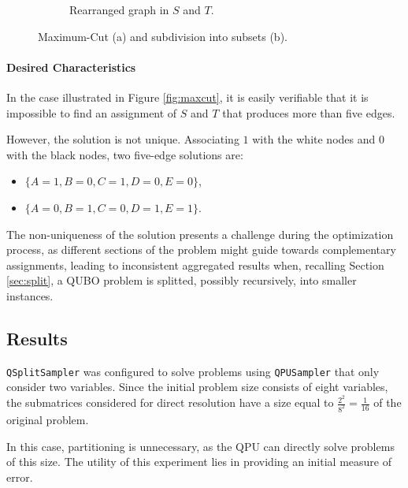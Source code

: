 \begin{figure}[H]
\begin{subfigure}[b]{0.48\textwidth}
        \caption{Rearranged graph in $S$ and $T$.}
        \label{fig:maxcutset}
    \end{subfigure}
    \caption{Maximum-Cut (a) and subdivision into subsets (b).}
\end{figure}

\paragraph{Desired Characteristics} In the case illustrated in Figure \ref{fig:maxcut}, it is easily verifiable that it is impossible to find an assignment of $S$ and $T$ that produces more than five edges.

However, the solution is not unique. 
Associating $1$ with the white nodes and $0$ with the black nodes, two five-edge solutions are: 
\begin{itemize}
    \item $\{A=1,B=0,C=1,D=0,E=0\}$,
    \item $\{A=0,B=1,C=0,D=1,E=1\}$.
\end{itemize}

The non-uniqueness of the solution presents a challenge during the optimization process, as different sections of the problem might guide towards complementary assignments, leading to inconsistent aggregated results when, recalling Section \ref{sec:split}, a QUBO problem is splitted, possibly recursively, into smaller instances.

\subsection{Results}

\texttt{QSplitSampler} was configured to solve problems using \texttt{QPUSampler} that only consider two variables. 
Since the initial problem size consists of eight variables, the submatrices considered for direct resolution have a size equal to $\frac{2^2}{8^2} = \frac{1}{16}$ of the original problem.

In this case, partitioning is unnecessary, as the QPU can directly solve problems of this size. 
The utility of this experiment lies in providing an initial measure of error.

